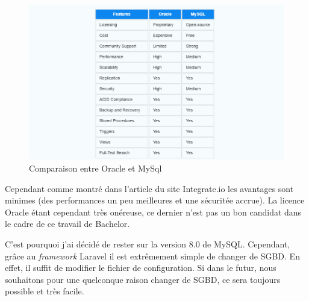 \begin{center}
    \begin{figure}[H]%
        \includegraphics[width=\textwidth]{./assets/figures/OracleVsMySql.png}
        \caption{Comparaison entre Oracle et MySql \label{OracleVsMySql.png}}
    \end{figure}
\end{center}
Cependant comme montré dans l'article du site Integrate.io \cite{Integrate.io} les avantages sont minimes (des performances un peu meilleures et une sécuritée accrue). La licence Oracle étant cependant très onéreuse, ce dernier n'est pas un bon candidat dans le cadre de ce travail de Bachelor.

C'est pourquoi j'ai décidé de rester sur la version 8.0 de MySQL. Cependant, grâce au \emph{framework} Laravel il est extrêmement simple de changer de SGBD. En effet, il suffit de modifier le fichier de configuration. Si dans le futur, nous souhaitons pour une quelconque raison changer de SGBD, ce sera toujours possible et très facile.

